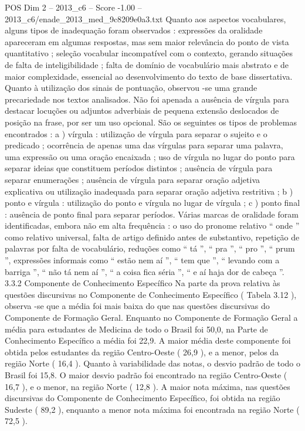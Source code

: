 \begin{textsample}{POS Dim 2 – 2013\_c6 – Score -1.00 – 2013\_c6/enade\_2013\_med\_9c8209e0a3.txt}
Quanto aos aspectos vocabulares, alguns tipos de inadequação foram observados : expressões da oralidade apareceram em algumas respostas, mas sem maior relevância do ponto de vista quantitativo ; seleção vocabular incompatível com o contexto, gerando situações de falta de inteligibilidade ; falta de domínio de vocabulário mais abstrato e de maior complexidade, essencial ao desenvolvimento do texto de base dissertativa.
Quanto à utilização dos sinais de pontuação, observou -se uma grande precariedade nos textos analisados.
Não foi apenada a ausência de vírgula para destacar locuções ou adjuntos adverbiais de pequena extensão deslocados de posição na frase, por ser um uso opcional.
São os seguintes os tipos de problemas encontrados : a ) vírgula : utilização de vírgula para separar o sujeito e o predicado ; ocorrência de apenas uma das vírgulas para separar uma palavra, uma expressão ou uma oração encaixada ; uso de vírgula no lugar do ponto para separar ideias que constituem períodos distintos ; ausência de vírgula para separar enumerações ; ausência de vírgula para separar oração adjetiva explicativa ou utilização inadequada para separar oração adjetiva restritiva ; b ) ponto e vírgula : utilização do ponto e vírgula no lugar de vírgula ; c ) ponto final : ausência de ponto final para separar períodos.
Várias marcas de oralidade foram identificadas, embora não em alta frequência : o uso do pronome relativo “ onde ” como relativo universal, falta de artigo definido antes de substantivo, repetição de palavras por falta de vocabulário, reduções como “ tá ”, “ pra ”, “ pro ”, “ prum ”, expressões informais como “ estão nem aí ”, “ tem que ”, “ levando com a barriga ”, “ não tá nem aí ”, “ a coisa fica séria ”, “ e aí haja dor de cabeça ”. 3.3.2 Componente de Conhecimento Específico Na parte da prova relativa às questões discursivas no Componente de Conhecimento Específico ( Tabela 3.12 ), observa -se que a média foi mais baixa do que nas questões discursivas do Componente de Formação Geral.
Enquanto no Componente de Formação Geral a média para estudantes de Medicina de todo o Brasil foi 50,0, na Parte de Conhecimento Específico a média foi 22,9.
A maior média deste componente foi obtida pelos estudantes da região Centro-Oeste ( 26,9 ), e a menor, pelos da região Norte ( 16,4 ).
Quanto à variabilidade das notas, o desvio padrão de todo o Brasil foi 15,8.
O maior desvio padrão foi encontrado na região Centro-Oeste ( 16,7 ), e o menor, na região Norte ( 12,8 ).
A maior nota máxima, nas questões discursivas do Componente de Conhecimento Específico, foi obtida na região Sudeste ( 89,2 ), enquanto a menor nota máxima foi encontrada na região Norte ( 72,5 ).

\end{textsample}
